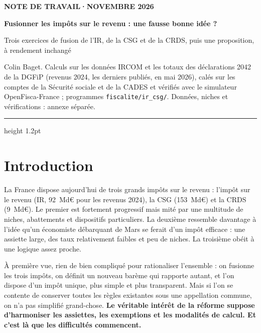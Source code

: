\documentclass[11pt,a4paper]{article}
\begin{document}
\renewcommand{\figurename}{Figure}\renewcommand{\tablename}{Tableau}

\thispagestyle{empty}
\vspace*{0.6cm}
{\footnotesize\color{ocre}\bfseries NOTE DE TRAVAIL\quad·\quad NOVEMBRE 2026\par}
\vspace{8pt}
{\fontsize{22}{26}\selectfont\bfseries\color{bleu}Fusionner les impôts sur le revenu : une fausse bonne idée ?\par}
\vspace{6pt}
{\large Trois exercices de fusion de l'IR, de la CSG et de la CRDS, puis une proposition, à rendement inchangé\par}
\vspace{8pt}
{\small Colin Baget. Calculs sur les données IRCOM et les totaux des déclarations 2042 de la DGFiP
(revenus 2024, les derniers publiés, en mai 2026), calés sur les comptes de la Sécurité sociale et de
la CADES et vérifiés avec le simulateur OpenFisca-France ; programmes \texttt{fiscalite/ir\_csg/}. Données,
niches et vérifications : annexe séparée.\par}
\vspace{6pt}
{\color{bleu}\hrule height 1.2pt}
\vspace{4pt}

\section*{Introduction}

La France dispose aujourd'hui de trois grands impôts sur le revenu : l'impôt sur le revenu (IR,
92~Md€ pour les revenus 2024), la CSG (153~Md€) et la CRDS (9~Md€). Le premier est fortement progressif
mais mité par une multitude de niches, abattements et dispositifs particuliers. La deuxième ressemble
davantage à l'idée qu'un économiste débarquant de Mars se ferait d'un impôt efficace : une assiette
large, des taux relativement faibles et peu de niches. La troisième obéit à une logique assez proche.

À première vue, rien de bien compliqué pour rationaliser l'ensemble : on fusionne les trois impôts, on
définit un nouveau barème qui rapporte autant, et l'on dispose d'un impôt unique, plus simple et plus
transparent. Mais si l'on se contente de conserver toutes les règles existantes sous une appellation
commune, on n'a pas simplifié grand-chose. \textbf{Le véritable intérêt de la réforme suppose d'harmoniser
les assiettes, les exemptions et les modalités de calcul. Et c'est là que les difficultés commencent.}
\end{document}
